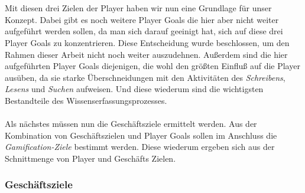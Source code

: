 \documentclass[a4paper,12pt]{scrartcl}
\begin{document}
\\\\
Mit diesen drei Zielen der Player haben wir nun eine Grundlage für unser Konzept. Dabei gibt es noch weitere Player Goals die hier aber nicht weiter aufgeführt werden sollen, da man sich darauf geeinigt hat, sich auf diese drei Player Goals zu konzentrieren. Diese Entscheidung wurde beschlossen, um den Rahmen dieser Arbeit nicht noch weiter auszudehnen. Außerdem sind die hier aufgeführten Player Goals diejenigen, die wohl den größten Einfluß auf die Player ausüben, da sie starke Überschneidungen mit den Aktivitäten des \textit{Schreibens}, \textit{Lesens} und \textit{Suchen} aufweisen. Und diese wiederum sind die wichtigsten Bestandteile des Wissenserfassungsprozesses.  
\\\\
Als nächstes müssen nun die Geschäftsziele ermittelt werden. Aus der Kombination von Geschäftszielen und Player Goals sollen im Anschluss die \textit{Gamification-Ziele} bestimmt werden. Diese wiederum ergeben sich aus der Schnittmenge von Player und Geschäfts Zielen.  
 
\subsubsection{Geschäftsziele}
\label{Geschäftsziele}








 























  
\newpage
\listoftables
\listoffigures
\newpage

\end{document}
